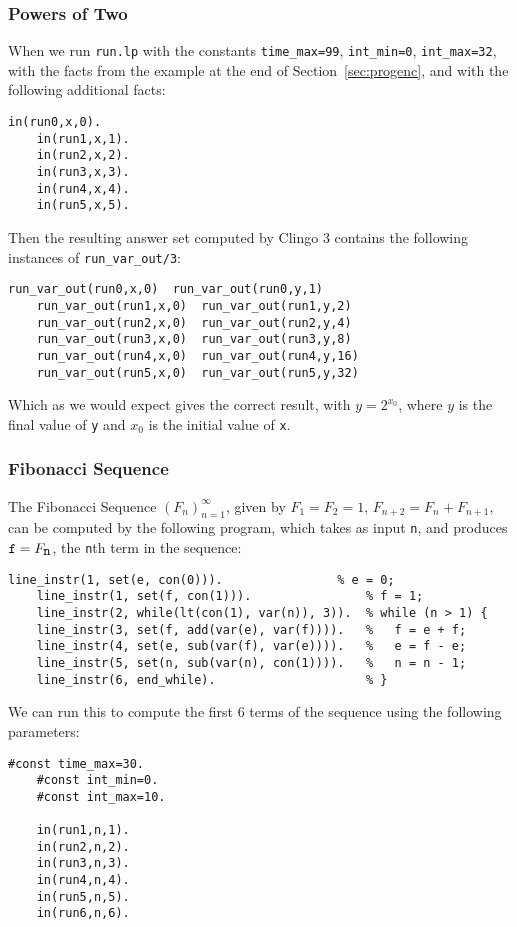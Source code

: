\documentclass[a4paper,twoside,notitlepage]{report}
\begin{document}
\subsubsection{Powers of Two}
When we run \verb|run.lp| with the constants \verb|time_max=99|, 
\verb|int_min=0|, \verb|int_max=32|, with the facts from the example at 
the end of Section~\ref{sec:progenc}, and with the following additional 
facts:
\begin{Verbatim}[samepage=true]
    in(run0,x,0).
    in(run1,x,1).
    in(run2,x,2).
    in(run3,x,3).
    in(run4,x,4).
    in(run5,x,5).
\end{Verbatim}
Then the resulting answer set computed by Clingo 3 contains the following 
instances of \verb|run_var_out/3|:
\begin{Verbatim}[samepage=true]
    run_var_out(run0,x,0)  run_var_out(run0,y,1)
    run_var_out(run1,x,0)  run_var_out(run1,y,2)
    run_var_out(run2,x,0)  run_var_out(run2,y,4)
    run_var_out(run3,x,0)  run_var_out(run3,y,8)
    run_var_out(run4,x,0)  run_var_out(run4,y,16) 
    run_var_out(run5,x,0)  run_var_out(run5,y,32)
\end{Verbatim}
Which as we would expect gives the correct result, with $y = 2^{x_0}$, 
where $y$ is the final value of \verb|y| and $x_0$ is the initial value of 
\verb|x|.

\subsubsection{Fibonacci Sequence}
The Fibonacci Sequence $(F_n)_{n=1}^\infty$, given by $F_1=F_2=1$, 
$F_{n+2}=F_{n}+F_{n+1}$, can be computed by the following program, which 
takes as input \verb|n|, and produces $\verb|f|=F_{\verb|n|}$, the 
\verb|n|th term in the sequence:
\begin{Verbatim}[samepage=true]
    line_instr(1, set(e, con(0))).                % e = 0;
    line_instr(1, set(f, con(1))).                % f = 1;
    line_instr(2, while(lt(con(1), var(n)), 3)).  % while (n > 1) {
    line_instr(3, set(f, add(var(e), var(f)))).   %   f = e + f;
    line_instr(4, set(e, sub(var(f), var(e)))).   %   e = f - e;
    line_instr(5, set(n, sub(var(n), con(1)))).   %   n = n - 1;
    line_instr(6, end_while).                     % }
\end{Verbatim}

We can run this to compute the first 6 terms of the sequence using the 
following parameters:
\begin{Verbatim}[samepage=true]
    #const time_max=30.
    #const int_min=0.
    #const int_max=10.
    
    in(run1,n,1).
    in(run2,n,2).
    in(run3,n,3).
    in(run4,n,4).
    in(run5,n,5).
    in(run6,n,6).
\end{Verbatim}
\end{document}
